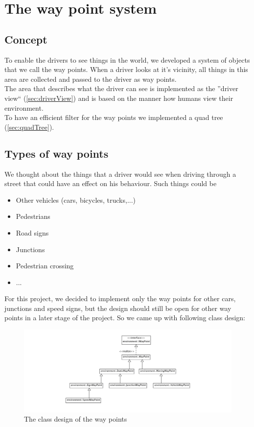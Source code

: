\section{The way point system}
\label{sec:wayPointSystem}

\subsection{Concept}

To enable the drivers to see things in the world, we developed a system of 
objects that we call the way points. When a driver looks at it's vicinity, all
things in this area are collected and passed to the driver as way points.\\

\noindent The area that describes what the driver can see is implemented as the 
''driver view`` (\ref{sec:driverView}) and is based on the manner 
how humans view their environment. \\

\noindent To have an efficient filter for the way points we implemented a quad tree 
(\ref{sec:quadTree}).

\subsection{Types of way points}

We thought about the things that a driver would see when driving through a 
street that could have an effect on his behaviour. Such things could be

\begin{itemize}
\item Other vehicles (cars, bicycles, trucks,...)
\item Pedestrians
\item Road signs
\item Junctions
\item Pedestrian crossing
\item ...
\end{itemize}

For this project, we decided to implement only the way points for other
cars, junctions and speed signs, but the design should still be open for 
other way points in a later stage of the project. So we came up with following
class design:

\begin{figure}[htb]
\includegraphics[width=\textwidth]{images/waypoints.png}
\caption{The class design of the way points}
\label{fig:waypoints}
\end{figure}

